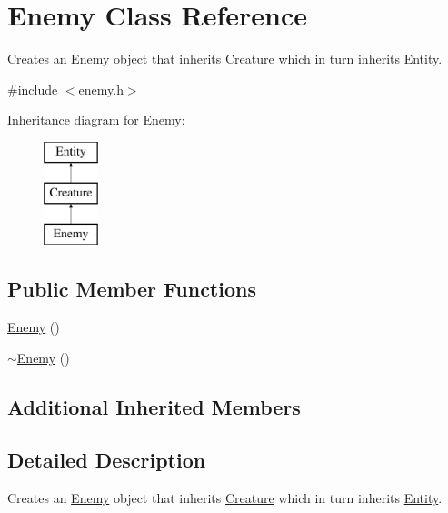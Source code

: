 \hypertarget{class_enemy}{\section{Enemy Class Reference}
\label{class_enemy}
}


Creates an \hyperlink{class_enemy}{Enemy} object that inherits \hyperlink{class_creature}{Creature} which in turn inherits \hyperlink{class_entity}{Entity}.  




{\ttfamily \#include $<$enemy.\+h$>$}

Inheritance diagram for Enemy\+:\begin{figure}[H]
\begin{center}
\leavevmode
\includegraphics[height=3.000000cm]{class_enemy}
\end{center}
\end{figure}
\subsection*{Public Member Functions}
\begin{DoxyCompactItemize}
\item 
\hyperlink{class_enemy_a94f30d348b6d2840fd71675472ba38dd}{Enemy} ()
\item 
\hyperlink{class_enemy_ac0eec4755e28c02688065f9657150ac3}{$\sim$\+Enemy} ()
\end{DoxyCompactItemize}
\subsection*{Additional Inherited Members}


\subsection{Detailed Description}
Creates an \hyperlink{class_enemy}{Enemy} object that inherits \hyperlink{class_creature}{Creature} which in turn inherits \hyperlink{class_entity}{Entity}. 


